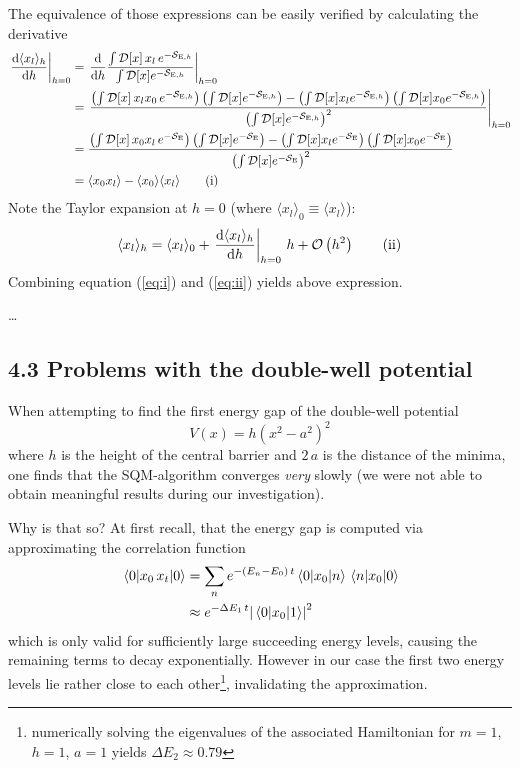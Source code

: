 \documentclass[11pt,a4paper]{scrartcl}
\newcommand{\avg}[1]{\langle#1\rangle}
\newcommand{\SE}{\ensuremath{\mathcal{S}_{\mathrm{E}}}}
\newcommand{\SEh}{\mathcal{S}_{\mathrm{E},h}}
\newcommand{\pathinth}[1]{\int\mathcal{D}[x]#1e^{-\SEh}}
\newcommand{\pathint}[1]{\int\mathcal{D}[x]#1e^{-\SE}}
\newcommand{\BigO}[1]{\mathcal{O}\left(#1\right)}
\begin{document}
The equivalence of those expressions can be easily verified by calculating the
derivative
\begin{align*}
    \eval{\dv{\avg{x_l}_h}{h}}_{h=0} &=
    \eval{\dv{h}\frac{\pathinth{\,x_l\,}}{\pathinth{}}}_{h=0} \\ &=
    \eval{\frac{\left(\pathinth{\,x_l x_0\,}\right)\left(\pathinth{}\right)
    -\left(\pathinth{x_l}\right)\left(\pathinth{x_0}\right)}
    {\left(\pathinth{}\right)^2}}_{h=0} \\ &=
    \frac{\left(\pathint{\,x_0 x_l\,}\right)\left(\pathint{}\right)
    -\left(\pathint{x_l}\right)\left(\pathint{x_0}\right)}
    {\left(\pathint{}\right)^2} \\ &=
    \avg{x_0 x_l}-\avg{x_0}\avg{x_l} \tag{i}\label{eq:i}
\end{align*}
Note the Taylor expansion at $h=0$ (where $\avg{x_l}_0\equiv\avg{x_l}$):
\begin{equation*}
    \avg{x_l}_h=\avg{x_l}_0+\eval{\dv{\avg{x_l}_h}{h}}_{h=0}\,h+\BigO{h^2}
    \tag{ii}\label{eq:ii}
\end{equation*}
Combining equation (\ref{eq:i}) and (\ref{eq:ii}) yields above expression.

\dots


\subsection*{4.3 Problems with the double-well potential}
When attempting to find the first energy gap of the double-well potential
\begin{equation}
    V(x)=h\left(x^2-a^2\right)^2
    \label{eq:double-well}
\end{equation}
where $h$ is the height of the central barrier and $2\,a$ is the distance of the
minima, one finds that the SQM-algorithm converges \emph{very} slowly (we were not
able to obtain meaningful results during our investigation).

Why is that so? At first recall, that the energy gap is computed via
approximating the correlation function
\begin{align*}
    \ev{x_0\,x_t}{0}&=\sum_{n}e^{-(E_n-E_0)\,t}\mel{0}{x_0}{n}\mel{n}{x_0}{0}
    \\&\approx{e^{-\Delta{E_1}\,t}}\abs{\mel{0}{x_0}{1}}^2
\end{align*}
which is only valid for sufficiently large succeeding energy levels, causing
the remaining terms to decay exponentially. However in our case the first two
energy levels lie rather close to each other\footnote{numerically solving the
eigenvalues of the associated Hamiltonian for $m=1$, $h=1$, $a=1$ yields
$\Delta{E_2}\approx0.79$}, invalidating the approximation.
\end{document}
